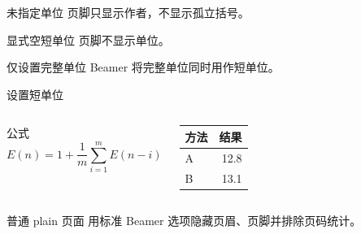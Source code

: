 \documentclass[aspectratio=169]{beamer}
\begin{document}
\institute{}
\begin{frame}{未指定单位}
  页脚只显示作者，不显示孤立括号。
\end{frame}

\begin{frame}{显式空短单位}
  页脚不显示单位。
\end{frame}

\begin{frame}{仅设置完整单位}
  Beamer 将完整单位同时用作短单位。
\end{frame}

\begin{frame}{设置短单位}
  \begin{columns}[T,onlytextwidth]
      \begin{block}{公式}
        \[
          E(n)=1+\frac{1}{m}\sum_{i=1}^{m}E(n-i)
        \]
      \end{block}
      \begin{tabular}{lr}
        \toprule
        方法 & 结果 \\
        \midrule
        A & 12.8 \\
        B & 13.1 \\
        \bottomrule
      \end{tabular}
  \end{columns}
\end{frame}

\begin{frame}{普通 plain 页面}
  用标准 Beamer 选项隐藏页眉、页脚并排除页码统计。
\end{frame}
\end{document}
